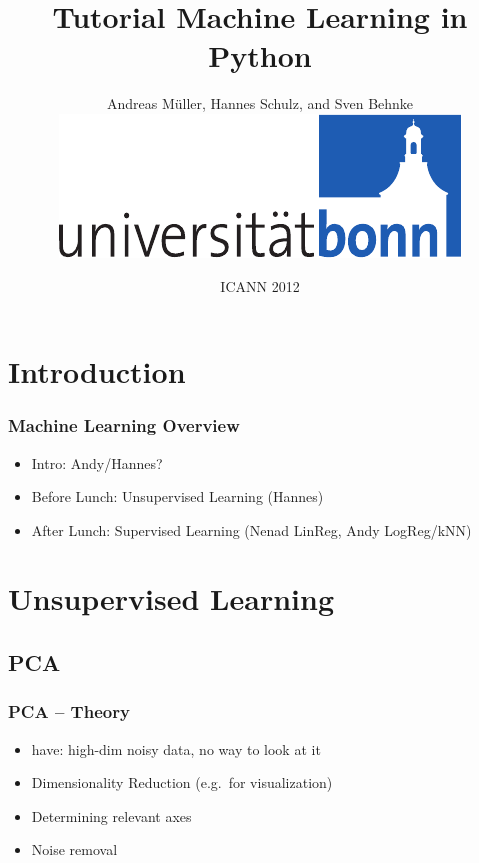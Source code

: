 \documentclass[english,final,compress]{beamer}
\title{Tutorial Machine Learning in Python}
\author{Andreas M\"{u}ller, Hannes Schulz, and Sven Behnke\\[5mm]\includegraphics[width=.2\linewidth]{style/Logo_UBo_h24_4c-crop}}
\date{ICANN 2012}
\renewcommand\maketitle{\frame[plain]{\titlepage}\addtocounter{framenumber}{-1}}
\begin{document}
\maketitle


\newcommand\fenc{f_{\mathrm{enc}}}
\newcommand\fdec{f_{\mathrm{dec}}}
\newcommand\Wand{\ensuremath{W_{\mathbf{and}}}}
\newcommand\Wor{\ensuremath{W_{\mathbf{or}}}}
\newcommand{\w}[1]{\ensuremath{\mathbf{#1}}}
\newcommand\loss{\ell}

\section{Introduction}

\begin{frame}
    \frametitle{Machine Learning Overview}
    \begin{itemize}
        \item Intro: Andy/Hannes?
        \item Before Lunch: Unsupervised Learning (Hannes)
        \item After Lunch: Supervised Learning (Nenad LinReg, Andy LogReg/kNN)
    \end{itemize}
\end{frame}

\section{Unsupervised Learning}

\subsection{PCA}

\begin{frame}
    \frametitle{PCA -- Theory}
    \begin{itemize}
        \item  have: high-dim noisy data, no way to look at it
        \item  Dimensionality Reduction (e.g.\ for visualization)
        \item  Determining relevant axes
        \item  Noise removal
    \end{itemize}
\end{frame}
\end{document}
